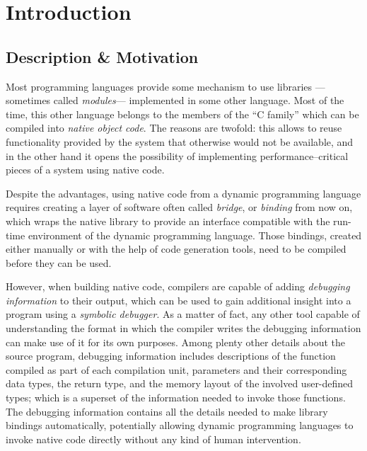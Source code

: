 
\chapter{Introduction}

\section{Description \& Motivation}

Most programming languages provide some mechanism to use libraries —sometimes
called \emph{modules}— implemented in some other language. Most of the time,
this other language belongs to the members of the “C family” which can be
compiled into \emph{native object code}. The reasons are twofold: this allows
to reuse functionality provided by the system that otherwise would not be
available, and in the other hand it opens the possibility of implementing
performance--critical pieces of a system using native code.

Despite the advantages, using native code from a dynamic programming language
requires creating a layer of software often called \emph{bridge}, or
\emph{binding} from now on, which wraps the native library to provide an
interface compatible with the run-time environment of the dynamic programming
language. Those bindings, created either manually or with the help of code
generation tools, need to be compiled before they can be used.

However, when building native code, compilers are capable of adding
\emph{debugging information} to their output, which can be used to gain
additional insight into a program using a \emph{symbolic debugger}. As
a matter of fact, any other tool capable of understanding the format in which
the compiler writes the debugging information can make use of it for its own
purposes. Among plenty other details about the source program, debugging
information includes descriptions of the function compiled as part of each
compilation unit, parameters and their corresponding data types, the return
type, and the memory layout of the involved user-defined types; which is a
superset of the information needed to invoke those functions. The debugging
information contains all the details needed to make library bindings
automatically, potentially allowing dynamic programming languages to invoke
native code directly without any kind of human intervention.



